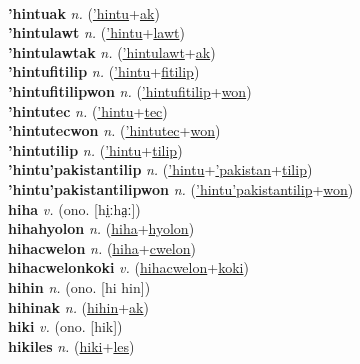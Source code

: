  \label{'hintu} \\
\textbf{'hintuak} \textit{n.} (\hyperref['hintu]{'hintu}+\hyperref[ak]{ak})
 \label{'hintuak} \\
\textbf{'hintulawt} \textit{n.} (\hyperref['hintu]{'hintu}+\hyperref[lawt]{lawt})
 \label{'hintulawt} \\
\textbf{'hintulawtak} \textit{n.} (\hyperref['hintulawt]{'hintulawt}+\hyperref[ak]{ak})
 \label{'hintulawtak} \\
\textbf{'hintufitilip} \textit{n.} (\hyperref['hintu]{'hintu}+\hyperref[fitilip]{fitilip})
 \label{'hintufitilip} \\
\textbf{'hintufitilipwon} \textit{n.} (\hyperref['hintufitilip]{'hintufitilip}+\hyperref[won]{won})
 \label{'hintufitilipwon} \\
\textbf{'hintutec} \textit{n.} (\hyperref['hintu]{'hintu}+\hyperref[tec]{tec})
 \label{'hintutec} \\
\textbf{'hintutecwon} \textit{n.} (\hyperref['hintutec]{'hintutec}+\hyperref[won]{won})
 \label{'hintutecwon} \\
\textbf{'hintutilip} \textit{n.} (\hyperref['hintu]{'hintu}+\hyperref[tilip]{tilip})
 \label{'hintutilip} \\
\textbf{'hintu'pakistantilip} \textit{n.} (\hyperref['hintu]{'hintu}+\hyperref['pakistan]{'pakistan}+\hyperref[tilip]{tilip})
 \label{'hintu'pakistantilip} \\
\textbf{'hintu'pakistantilipwon} \textit{n.} (\hyperref['hintu'pakistantilip]{'hintu'pakistantilip}+\hyperref[won]{won})
 \label{'hintu'pakistantilipwon} \\
\textbf{hiha} \textit{v.} (ono. [hi̤ːha̤ː])
 \label{hiha} \\
\textbf{hihahyolon} \textit{n.} (\hyperref[hiha]{hiha}+\hyperref[hyolon]{hyolon})
 \label{hihahyolon} \\
\textbf{hihacwelon} \textit{n.} (\hyperref[hiha]{hiha}+\hyperref[cwelon]{cwelon})
 \label{hihacwelon} \\
\textbf{hihacwelonkoki} \textit{v.} (\hyperref[hihacwelon]{hihacwelon}+\hyperref[koki]{koki})
 \label{hihacwelonkoki} \\
\textbf{hihin} \textit{n.} (ono. [hi hin])
 \label{hihin} \\
\textbf{hihinak} \textit{n.} (\hyperref[hihin]{hihin}+\hyperref[ak]{ak})
 \label{hihinak} \\
\textbf{hiki} \textit{v.} (ono. [hik])
 \label{hiki} \\
\textbf{hikiles} \textit{n.} (\hyperref[hiki]{hiki}+\hyperref[les]{les})
